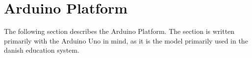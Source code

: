 \section{Arduino Platform}
The following section describes the Arduino Platform. 
The section is written primarily with the Arduino Uno in mind, as it is the model primarily used in the danish education system.



